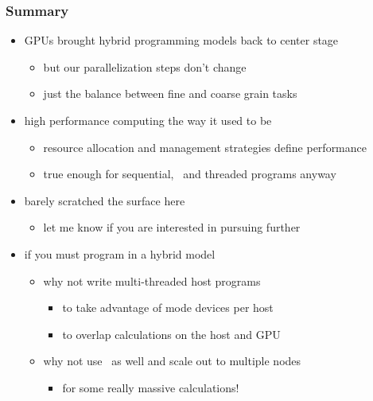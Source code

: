 \begin{frame}[fragile]
%
  \frametitle{Summary}
%
  \begin{itemize}
%
  \item GPUs brought hybrid programming models back to center stage
    \begin{itemize}
    \item but our parallelization steps don't change
    \item just the balance between fine and coarse grain tasks
    \end{itemize}
%
  \item high performance computing the way it used to be
    \begin{itemize}
    \item resource allocation and management strategies define performance
    \item true enough for sequential, \mpi\ and threaded programs anyway
    \end{itemize}
%
  \item barely scratched the surface here
    \begin{itemize}
    \item let me know if you are interested in pursuing further
    \end{itemize}
%
  \item if you must program in a hybrid model
    \begin{itemize}
    \item why not write multi-threaded host programs
      \begin{itemize}
      \item to take advantage of mode devices per host
      \item to overlap calculations on the host and GPU
      \end{itemize}
    \item why not use \mpi\ as well and scale out to multiple nodes
      \begin{itemize}
      \item for some really massive calculations!
      \end{itemize}
    \end{itemize}
%
  \end{itemize}
%
\end{frame}

